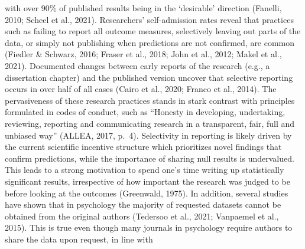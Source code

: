 \documentclass[
  man,floatsintext]{apa7}
\begin{document}
with over 90\% of published results being in the `desirable' direction (Fanelli, 2010; Scheel
et al., 2021). Researchers' self-admission rates reveal that practices such as failing to
report all outcome measures, selectively leaving out parts of the data, or simply not
publishing when predictions are not confirmed, are common (Fiedler \& Schwarz, 2016;
Fraser et al., 2018; John et al., 2012; Makel et al., 2021). Documented changes between
early reports of the research (e.g., a dissertation chapter) and the published version
uncover that selective reporting occurs in over half of all cases (Cairo et al., 2020; Franco
et al., 2014). The pervasiveness of these research practices stands in stark contrast with
principles formulated in codes of conduct, such as ``Honesty in developing, undertaking,
reviewing, reporting and communicating research in a transparent, fair, full and unbiased
way'' (ALLEA, 2017, p.~4).
Selectivity in reporting is likely driven by the current scientific incentive structure which
prioritizes novel findings that confirm predictions, while the importance of sharing null
results is undervalued. This leads to a strong motivation to spend one's time writing up
statistically significant results, irrespective of how important the research was judged to be
before looking at the outcomes (Greenwald, 1975). In addition, several studies have
shown that in psychology the majority of requested datasets cannot be obtained from the
original authors (Tedersoo et al., 2021; Vanpaemel et al., 2015). This is true even though
many journals in psychology require authors to share the data upon request, in line with
\end{document}
